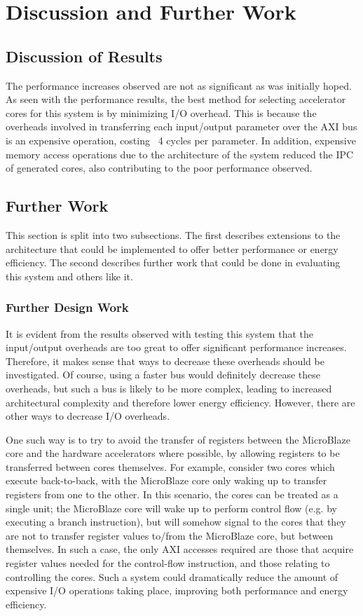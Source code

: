 \documentclass{UoYCSproject}
\begin{document}
\chapter{Discussion and Further Work}

\section{Discussion of Results}

The performance increases observed are not as significant as was initially hoped.
As seen with the performance results, the best method for selecting accelerator cores for this system is by minimizing
I/O overhead. This is because the overheads involved in transferring each input/output parameter over the AXI bus is an
expensive operation, costing ~4 cycles per parameter. In addition, expensive memory access operations
due to the architecture of the system reduced the IPC of generated cores, also contributing to
the poor performance observed.

\section{Further Work}

This section is split into two subsections. The first describes extensions to the architecture that could be implemented
to offer better performance or energy efficiency. The second describes further work that could be done in evaluating this
system and others like it.

\subsection{Further Design Work}

It is evident from the results observed with testing this system that the input/output overheads are too great to
offer significant performance increases. Therefore, it makes sense that ways to decrease these overheads should be investigated.
Of course, using a faster bus would definitely decrease these overheads, but such a bus is likely to be more complex, leading
to increased architectural complexity and therefore lower energy efficiency. However, there are other ways to decrease
I/O overheads.

One such way is to try to avoid the transfer of registers between the MicroBlaze core and the hardware accelerators where
possible, by allowing registers to be transferred between cores themselves. For example, consider two cores which
execute back-to-back, with the MicroBlaze core only waking up to transfer registers from one to the other. In this scenario,
the cores can be treated as a single unit; the MicroBlaze core will wake up to perform control flow (e.g. by executing a branch
instruction), but will somehow signal to the cores that they are not to transfer register values to/from the MicroBlaze core,
but between themselves. In such a case, the only AXI accesses required are those that acquire register values needed for the
control-flow instruction, and those relating to controlling the cores. Such a system could dramatically reduce the amount
of expensive I/O operations taking place, improving both performance and energy efficiency.
\end{document}
